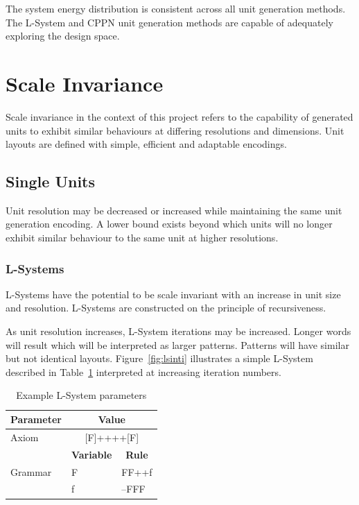 The system energy distribution is consistent across all unit generation methods. The L-System and CPPN unit generation methods are capable of adequately exploring the design space.



\section{Scale Invariance}

Scale invariance in the context of this project refers to the capability of generated units to exhibit similar behaviours at differing resolutions and dimensions. Unit layouts are defined with simple, efficient and adaptable encodings.

\subsection{Single Units}

Unit resolution may be decreased or increased while maintaining the same unit generation encoding. A lower bound exists beyond which units will no longer exhibit similar behaviour to the same unit at higher resolutions.

\subsubsection{L-Systems}

L-Systems have the potential to be scale invariant with an increase in unit size and resolution. L-Systems are constructed on the principle of recursiveness.

As unit resolution increases, L-System iterations may be increased. Longer words will result which will be interpreted as larger patterns. Patterns will have similar but not identical layouts. Figure~\ref{fig:lsinti} illustrates a simple L-System described in Table~\ref{tab:exlspar} interpreted at increasing iteration numbers.

\begin{table}[H]
\centering
\caption{Example L-System parameters}
\label{tab:exlspar}
\begin{tabular}{@{}lcl@{}}
\toprule
\multicolumn{1}{c}{\textbf{Parameter}} & \multicolumn{2}{c}{\textbf{Value}}                        \\ \midrule
Axiom                                  & \multicolumn{2}{c}{{[}F{]}++++{[}F{]}}                    \\ \cmidrule(l){2-3} 
\multirow{3}{*}{Grammar}               & \textbf{Variable}     & \multicolumn{1}{c}{\textbf{Rule}} \\ \cmidrule(l){2-3} 
                                       & \multicolumn{1}{l}{F} & FF++f                             \\
                                       & \multicolumn{1}{l}{f} & --FFF                             \\ \bottomrule
\end{tabular}
\end{table}


